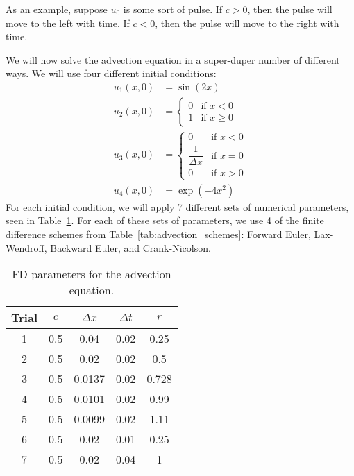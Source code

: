 \documentclass[twocolumn]{myarticle}
\begin{document}
As an example, suppose $ u_0 $ is some sort of pulse.
If $ c > 0 $, then the pulse will move to the left with time.
If $ c < 0 $, then the pulse will move to the right with time.

We will now solve the advection equation in a super-duper number of different ways.
We will use four different initial conditions:
\begin{align}
    u_1(x,0) &= \sin(2x)
    \\
    u_2(x,0) &= \begin{cases} 0 & \text{if } x < 0 \\ 1 & \text{if } x \geq 0 \end{cases}
    \\
    u_3(x,0) &= \begin{cases} 0 & \text{if } x < 0 \\ \dfrac{1}{\Delta x} & \text{if } x = 0 \\ 0 & \text{if } x > 0 \end{cases}
    \\
    u_4(x,0) &= \exp\left( -4 x^2 \right)
\end{align}
For each initial condition, we will apply 7 different sets of numerical parameters, seen in Table~\ref{tab:advection_parameters}.
For each of these sets of parameters, we use 4 of the finite difference schemes from Table~\ref{tab:advection_schemes}: Forward Euler, Lax-Wendroff, Backward Euler, and Crank-Nicolson.

\begin{table}[ht]
    \centering
    \begin{tabular}{ccccc}
        \toprule
        Trial & $ c $ & $ \Delta x $ & $ \Delta t $ & $ r $
        \\
        \midrule
        1 & 0.5 & 0.04 & 0.02 & 0.25
        \\
        2 & 0.5 & 0.02 & 0.02 & 0.5
        \\
        3 & 0.5 & 0.0137 & 0.02 & 0.728
        \\
        4 & 0.5 & 0.0101 & 0.02 & 0.99
        \\
        5 & 0.5 & 0.0099 & 0.02 & 1.11
        \\
        6 & 0.5 & 0.02 & 0.01 & 0.25
        \\
        7 & 0.5 & 0.02 & 0.04 & 1
        \\
        \bottomrule
    \end{tabular}
    \caption{FD parameters for the advection equation.}
    \label{tab:advection_parameters}
\end{table}
\end{document}
